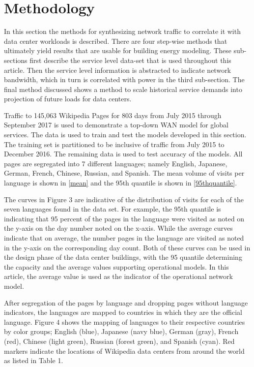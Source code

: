 \section{Methodology} 
    In this section the methods for synthesizing network traffic to correlate it with data center workloads is described. There are four step-wise methods that ultimately yield results that are usable for building energy modeling. These sub-sections first describe the service level data-set that is used throughout this article. Then the service level information is abstracted to indicate network bandwidth, which in turn is correlated with power in the third sub-section. The final method discussed shows a method to scale historical service demands into projection of future loads for data centers.  
    
    

    Traffic to 145,063 Wikipedia Pages for 803 days from July 2015 through September 2017 is used to demonstrate a top-down WAN model for global services. The data is used to train and test the models developed in this section. The training set is partitioned to be inclusive of traffic from July 2015 to December 2016. The remaining data is used to test accuracy of the models. All pages are segregated into 7 different languages; namely English, Japanese, German, French, Chinese, Russian, and Spanish. The mean volume of visits per language is shown in \ref{mean} and the 95th quantile is shown in \ref{95thquantile}.  
    
    The curves in Figure 3 are indicative of the distribution of visits for each of the seven languages found in the data set.  For example, the 95th quantile is indicating that 95 percent of the pages in the language were visited as noted on the y-axis on the day number noted on the x-axis. While the average curves indicate that on average, the number pages in the language are visited as noted in the y-axis on the corresponding day count. Both of these curves can be used in the design phase of the data center buildings, with the 95 quantile determining the capacity and the average values supporting operational models. In this article, the average value is used as the indicator of the operational network model. 
    
    
    
    After segregation of the pages by language and dropping pages without language indicators, the languages are mapped to countries in which they are the official language. Figure 4 shows the mapping of languages to their respective countries by color groups; English (blue), Japanese (navy blue), German (gray), French (red), Chinese (light green), Russian (forest green), and Spanish (cyan). Red markers indicate the locations of Wikipedia data centers from around the world as listed in Table 1.
    
    